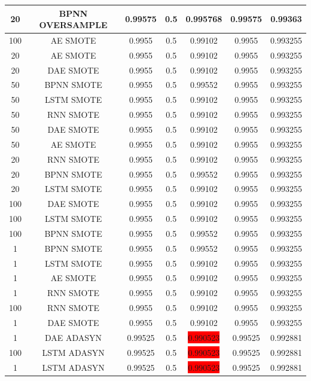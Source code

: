 \begin{longtable}{|c|c|c|c|c|c|c|}
	20 & BPNN OVERSAMPLE & 0.99575 & 0.5 & 0.995768 & 0.99575 & 0.99363\\ \hline
	100 & AE SMOTE & 0.9955 & 0.5 & 0.99102 & 0.9955 & 0.993255\\ \hline
	20 & AE SMOTE & 0.9955 & 0.5 & 0.99102 & 0.9955 & 0.993255\\ \hline
	20 & DAE SMOTE & 0.9955 & 0.5 & 0.99102 & 0.9955 & 0.993255\\ \hline
	50 & BPNN SMOTE & 0.9955 & 0.5 & 0.99552 & 0.9955 & 0.993255\\ \hline
	50 & LSTM SMOTE & 0.9955 & 0.5 & 0.99102 & 0.9955 & 0.993255\\ \hline
	50 & RNN SMOTE & 0.9955 & 0.5 & 0.99102 & 0.9955 & 0.993255\\ \hline
	50 & DAE SMOTE & 0.9955 & 0.5 & 0.99102 & 0.9955 & 0.993255\\ \hline
	50 & AE SMOTE & 0.9955 & 0.5 & 0.99102 & 0.9955 & 0.993255\\ \hline
	20 & RNN SMOTE & 0.9955 & 0.5 & 0.99102 & 0.9955 & 0.993255\\ \hline
	20 & BPNN SMOTE & 0.9955 & 0.5 & 0.99552 & 0.9955 & 0.993255\\ \hline
	20 & LSTM SMOTE & 0.9955 & 0.5 & 0.99102 & 0.9955 & 0.993255\\ \hline
	100 & DAE SMOTE & 0.9955 & 0.5 & 0.99102 & 0.9955 & 0.993255\\ \hline
	100 & LSTM SMOTE & 0.9955 & 0.5 & 0.99102 & 0.9955 & 0.993255\\ \hline
	100 & BPNN SMOTE & 0.9955 & 0.5 & 0.99552 & 0.9955 & 0.993255\\ \hline
	1 & BPNN SMOTE & 0.9955 & 0.5 & 0.99552 & 0.9955 & 0.993255\\ \hline
	1 & LSTM SMOTE & 0.9955 & 0.5 & 0.99102 & 0.9955 & 0.993255\\ \hline
	1 & AE SMOTE & 0.9955 & 0.5 & 0.99102 & 0.9955 & 0.993255\\ \hline
	1 & RNN SMOTE & 0.9955 & 0.5 & 0.99102 & 0.9955 & 0.993255\\ \hline
	100 & RNN SMOTE & 0.9955 & 0.5 & 0.99102 & 0.9955 & 0.993255\\ \hline
	1 & DAE SMOTE & 0.9955 & 0.5 & 0.99102 & 0.9955 & 0.993255\\ \hline
	1 & DAE ADASYN & 0.99525 & 0.5 & \colorbox{red}{0.990523} & 0.99525 & 0.992881\\ \hline
	100 & LSTM ADASYN & 0.99525 & 0.5 & \colorbox{red}{0.990523} & 0.99525 & 0.992881\\ \hline
	1 & LSTM ADASYN & 0.99525 & 0.5 & \colorbox{red}{0.990523} & 0.99525 & 0.992881\\ \hline

\end{longtable}
